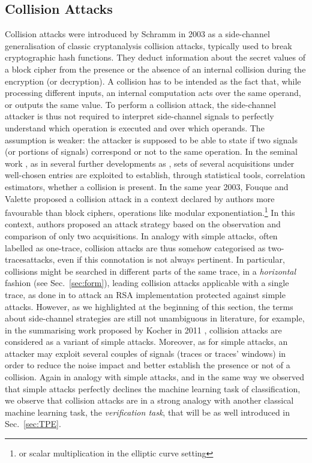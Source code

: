 \subsection{Collision Attacks}
Collision attacks were introduced by Schramm \etal in 2003 \cite{schramm2003new} as a side-channel generalisation of classic cryptanalysis collision attacks, typically used to break cryptographic hash functions. They deduct information about the secret values of a block cipher from the presence or the absence of an internal collision during the encryption (or decryption). A collision has to be intended as the fact that, while processing different inputs, an internal computation acts over the same operand, or outputs the same value. To perform a collision attack, the side-channel attacker is thus not required to interpret side-channel signals to perfectly understand which operation is executed and over which operands. The assumption is weaker: the attacker is supposed to be able to state if two signals (or portions of signals) correspond or not to the same operation. In the seminal work \cite{schramm2003new}, as in several further developments as \cite{ledig2004enhancing,schramm2004collision,bogdanov2007improved,bogdanov2008multiple}, sets of several acquisitions under well-chosen entries are exploited to establish, through statistical tools, \eg correlation estimators, whether a collision is present. In the same year 2003, Fouque and Valette \cite{fouque2003doubling} proposed a collision attack in a context declared by authors more favourable than block ciphers, \ie operations like modular exponentiation.\footnote{or scalar multiplication in the elliptic curve setting} In this context, authors proposed an attack strategy based on the observation and comparison of only two acquisitions. In analogy with simple attacks, often labelled as \textquotedbl one-trace\textquotedbl , collision attacks are thus somehow categorised as \textquotedbl two-traces\textquotedbl attacks, even if this connotation is not always pertinent. In particular, collisions might be searched in different parts of the same trace, \ie in a \emph{horizontal} fashion (see Sec.~\ref{sec:form}), leading collision attacks applicable with a single trace, \eg as done in \cite{clavier2010horizontal} to attack an RSA implementation protected against simple attacks. However, as we highlighted at the beginning of this section, the terms about side-channel strategies are still not unambiguous in literature, for example, in the summarising work proposed by Kocher \etal in 2011 \cite{kocher2011introduction}, collision attacks are considered as a variant of simple attacks. Moreover, as for simple attacks, an attacker may exploit several couples of signals (traces or traces' windows) in order to reduce the noise impact and better establish the presence or not of a collision. Again in analogy with simple attacks, and in the same way we observed that simple attacks perfectly declines the machine learning task of classification, we observe that collision attacks are in a strong analogy with another classical machine learning task, \ie the \emph{verification task}, that will be as well introduced in Sec.~\ref{sec:TPE}.

